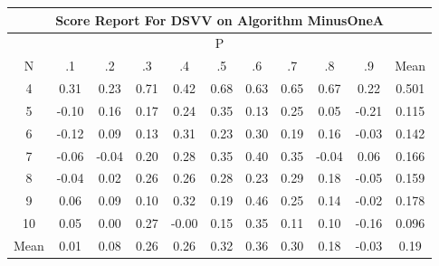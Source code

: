 \documentclass[11pt,a4paper]{report}
\begin{document}
\begin{longtable}{ | c || c | c | c | c | c | c | c | c | c || c |}
\hline
\multicolumn{11}{|c|}{ Score Report For DSVV on Algorithm MinusOneA} \\
\hline
\multicolumn{11}{|c|}{ P } \\
\hline
N & .1 & .2 & .3 & .4 & .5 & .6 & .7 & .8 & .9 & Mean\\
 \hline
 \hline
 \endhead
  4 &  \cellcolor[HTML]{F7F7FF} 0.31 &  \cellcolor[HTML]{F7F7FF} 0.23 &  \cellcolor[HTML]{EFEFFF} 0.71 &  \cellcolor[HTML]{F7F7FF} 0.42 &  \cellcolor[HTML]{EFEFFF} 0.68 &  \cellcolor[HTML]{EFEFFF} 0.63 &  \cellcolor[HTML]{EFEFFF} 0.65 &  \cellcolor[HTML]{EFEFFF} 0.67 &  \cellcolor[HTML]{F7F7FF} 0.22 & 0.501 \\
  5 &  \cellcolor[HTML]{FFFFFF} -0.10 &  \cellcolor[HTML]{FFFFFF} 0.16 &  \cellcolor[HTML]{F7F7FF} 0.17 &  \cellcolor[HTML]{F7F7FF} 0.24 &  \cellcolor[HTML]{F7F7FF} 0.35 &  \cellcolor[HTML]{FFFFFF} 0.13 &  \cellcolor[HTML]{F7F7FF} 0.25 &  \cellcolor[HTML]{FFFFFF} 0.05 &  \cellcolor[HTML]{FFF7F7} -0.21 & 0.115 \\
  6 &  \cellcolor[HTML]{FFFFFF} -0.12 &  \cellcolor[HTML]{FFFFFF} 0.09 &  \cellcolor[HTML]{FFFFFF} 0.13 &  \cellcolor[HTML]{F7F7FF} 0.31 &  \cellcolor[HTML]{F7F7FF} 0.23 &  \cellcolor[HTML]{F7F7FF} 0.30 &  \cellcolor[HTML]{F7F7FF} 0.19 &  \cellcolor[HTML]{F7F7FF} 0.16 &  \cellcolor[HTML]{FFFFFF} -0.03 & 0.142 \\
  7 &  \cellcolor[HTML]{FFFFFF} -0.06 &  \cellcolor[HTML]{FFFFFF} -0.04 &  \cellcolor[HTML]{F7F7FF} 0.20 &  \cellcolor[HTML]{F7F7FF} 0.28 &  \cellcolor[HTML]{F7F7FF} 0.35 &  \cellcolor[HTML]{F7F7FF} 0.40 &  \cellcolor[HTML]{F7F7FF} 0.35 &  \cellcolor[HTML]{FFFFFF} -0.04 &  \cellcolor[HTML]{FFFFFF} 0.06 & 0.166 \\
  8 &  \cellcolor[HTML]{FFFFFF} -0.04 &  \cellcolor[HTML]{FFFFFF} 0.02 &  \cellcolor[HTML]{F7F7FF} 0.26 &  \cellcolor[HTML]{F7F7FF} 0.26 &  \cellcolor[HTML]{F7F7FF} 0.28 &  \cellcolor[HTML]{F7F7FF} 0.23 &  \cellcolor[HTML]{F7F7FF} 0.29 &  \cellcolor[HTML]{F7F7FF} 0.18 &  \cellcolor[HTML]{FFFFFF} -0.05 & 0.159 \\
  9 &  \cellcolor[HTML]{FFFFFF} 0.06 &  \cellcolor[HTML]{FFFFFF} 0.09 &  \cellcolor[HTML]{FFFFFF} 0.10 &  \cellcolor[HTML]{F7F7FF} 0.32 &  \cellcolor[HTML]{F7F7FF} 0.19 &  \cellcolor[HTML]{F7F7FF} 0.46 &  \cellcolor[HTML]{F7F7FF} 0.25 &  \cellcolor[HTML]{FFFFFF} 0.14 &  \cellcolor[HTML]{FFFFFF} -0.02 & 0.178 \\
  10 &  \cellcolor[HTML]{FFFFFF} 0.05 &  \cellcolor[HTML]{FFFFFF} 0.00 &  \cellcolor[HTML]{F7F7FF} 0.27 &  \cellcolor[HTML]{FFFFFF} -0.00 &  \cellcolor[HTML]{FFFFFF} 0.15 &  \cellcolor[HTML]{F7F7FF} 0.35 &  \cellcolor[HTML]{FFFFFF} 0.11 &  \cellcolor[HTML]{FFFFFF} 0.10 &  \cellcolor[HTML]{FFF7F7} -0.16 & 0.096 \\
 \hline
 \hline
Mean &  \cellcolor[HTML]{FFFFFF} 0.01 &  \cellcolor[HTML]{FFFFFF} 0.08 &  \cellcolor[HTML]{F7F7FF} 0.26 &  \cellcolor[HTML]{F7F7FF} 0.26 &  \cellcolor[HTML]{F7F7FF} 0.32 &  \cellcolor[HTML]{F7F7FF} 0.36 &  \cellcolor[HTML]{F7F7FF} 0.30 &  \cellcolor[HTML]{F7F7FF} 0.18 &  \cellcolor[HTML]{FFFFFF} -0.03 &  \cellcolor[HTML]{F7F7FF} 0.19
\end{longtable}
\end{document}
